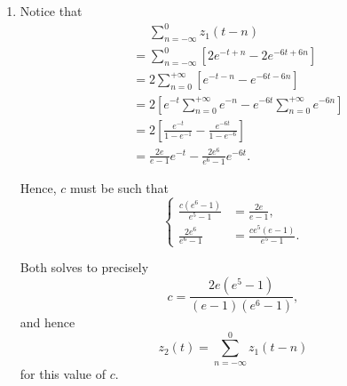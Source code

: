\begin{enumerate}
    \item Notice that
          \begin{align*}
               & \phantom{=} \sum_{n = -\infty}^{0} z_1(t - n)                                                  \\
               & = \sum_{n = -\infty}^{0} [2e^{-t + n} - 2e^{-6t + 6n}]                                         \\
               & = 2\sum_{n = 0}^{+\infty} [e^{-t-n} - e^{-6t-6n}]                                              \\
               & = 2 \left[e^{-t} \sum_{n = 0}^{+\infty} e^{-n} - e^{-6t} \sum_{n = 0}^{+\infty} e^{-6n}\right] \\
               & = 2 \left[\frac{e^{-t}}{1 - e^{-1}} - \frac{e^{-6t}}{1 - e^{-6}}\right]                        \\
               & = \frac{2e}{e - 1} e^{-t} - \frac{2e^6}{e^6 - 1} e^{-6t}.
          \end{align*}

          Hence, \(c\) must be such that
          \[
              \left\{
              \begin{aligned}
                  \frac{c(e^6 - 1)}{e^5 - 1} & = \frac{2e}{e - 1},             \\
                  \frac{2e^6}{e^6 - 1}       & = \frac{ce^5 (e - 1)}{e^5 - 1}.
              \end{aligned}
              \right.
          \]

          Both solves to precisely
          \[
              c = \frac{2e(e^5 - 1)}{(e - 1)(e^6 - 1)},
          \]
          and hence
          \[
              z_2(t) = \sum_{n = -\infty}^{0} z_1(t - n)
          \]
          for this value of \(c\).
\end{enumerate}